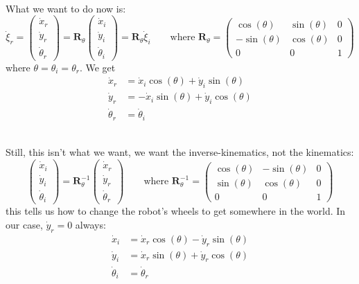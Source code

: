 \documentclass[13pt]{article}
\begin{document}
\hfill \\
\noindent
What we want to do now is:
\begin{equation}
	\dot \xi_{r} = \begin{pmatrix} \dot x_{r} \\ \dot y_{r} \\ \dot \theta_{r} \end{pmatrix} =
	\bm{R}_{\theta} \begin{pmatrix} \dot x_{i} \\ \dot y_{i} \\ \dot \theta_{i} \end{pmatrix} = \bm{R}_{\theta} \dot
	\xi_{i}\qquad \text{where }
	\bm{R}_{\theta} = \begin{pmatrix} \cos(\theta) & \sin(\theta) & 0 \\ - \sin(\theta) & \cos(\theta) & 0 \\ 0 & 0 & 1 \end{pmatrix}
\end{equation}
where $\theta = \theta_{i} = \theta_{r}$. We get
\begin{align}
	\dot x_{r} &= \dot x_{i} \cos(\theta) + \dot y_{i} \sin(\theta) \\
	\dot y_{r} &= - \dot x_{i} \sin(\theta) + \dot y_{i} \cos(\theta) \\
	\dot \theta_{r} &= \dot \theta_{i}
\end{align}

\hfill \\
\noindent
Still, this isn't what we want, we want the inverse-kinematics, not the kinematics:
\begin{equation}
	\begin{pmatrix} \dot x_{i} \\ \dot y_{i} \\ \dot \theta_{i} \end{pmatrix} =
	\bm{R}_{\theta}^{-1} \begin{pmatrix} \dot x_{r} \\ \dot y_{r} \\ \dot \theta_{r} \end{pmatrix} \qquad
	\text{where }
	\bm{R}_{\theta}^{-1} = \begin{pmatrix} \cos(\theta) & -\sin(\theta) & 0 \\ \sin(\theta) & \cos(\theta) & 0 \\ 0 & 0 & 1 \end{pmatrix}
\end{equation}
this tells us how to change the robot's wheels to get somewhere in the world. In our case, $\dot y_{r} = 0$ always:
\begin{align}
	\dot x_{i} &= \dot x_{r} \cos(\theta) - \dot y_{r} \sin(\theta) \\
	\dot y_{i} &= \dot x_{r} \sin(\theta) + \dot y_{r} \cos(\theta) \\
	\dot \theta_{i} &=  \dot \theta_{r}
\end{align}
\end{document}
